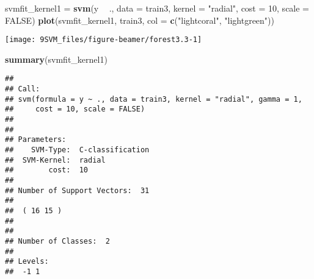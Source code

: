 \documentclass[10pt,ignorenonframetext,]{beamer}
\newenvironment{Shaded}{\begin{snugshade}}{\end{snugshade}}
\newcommand{\KeywordTok}[1]{\textcolor[rgb]{0.13,0.29,0.53}{\textbf{#1}}}
\newcommand{\DataTypeTok}[1]{\textcolor[rgb]{0.13,0.29,0.53}{#1}}
\newcommand{\DecValTok}[1]{\textcolor[rgb]{0.00,0.00,0.81}{#1}}
\newcommand{\StringTok}[1]{\textcolor[rgb]{0.31,0.60,0.02}{#1}}
\newcommand{\OtherTok}[1]{\textcolor[rgb]{0.56,0.35,0.01}{#1}}
\newcommand{\OperatorTok}[1]{\textcolor[rgb]{0.81,0.36,0.00}{\textbf{#1}}}
\newcommand{\NormalTok}[1]{#1}
\begin{document}
\begin{frame}[fragile]

\scriptsize

\begin{Shaded}
\begin{Highlighting}[]
\NormalTok{svmfit_kernel1 =}\StringTok{ }\KeywordTok{svm}\NormalTok{(y }\OperatorTok{~}\StringTok{ }\NormalTok{., }\DataTypeTok{data =}\NormalTok{ train3, }\DataTypeTok{kernel =} \StringTok{"radial"}\NormalTok{, }\DataTypeTok{cost =} \DecValTok{10}\NormalTok{, }
    \DataTypeTok{scale =} \OtherTok{FALSE}\NormalTok{)}
\KeywordTok{plot}\NormalTok{(svmfit_kernel1, train3, }\DataTypeTok{col =} \KeywordTok{c}\NormalTok{(}\StringTok{"lightcoral"}\NormalTok{, }\StringTok{"lightgreen"}\NormalTok{))}
\end{Highlighting}
\end{Shaded}

\begin{center}\texttt{[image: 9SVM\_files/figure-beamer/forest3.3-1]} \end{center}

\end{frame}

\begin{frame}[fragile]

\scriptsize

\begin{Shaded}
\begin{Highlighting}[]
\KeywordTok{summary}\NormalTok{(svmfit_kernel1)}
\end{Highlighting}
\end{Shaded}

\begin{verbatim}
## 
## Call:
## svm(formula = y ~ ., data = train3, kernel = "radial", gamma = 1, 
##     cost = 10, scale = FALSE)
## 
## 
## Parameters:
##    SVM-Type:  C-classification 
##  SVM-Kernel:  radial 
##        cost:  10 
## 
## Number of Support Vectors:  31
## 
##  ( 16 15 )
## 
## 
## Number of Classes:  2 
## 
## Levels: 
##  -1 1
\end{verbatim}

\normalsize

\end{frame}
\end{document}
